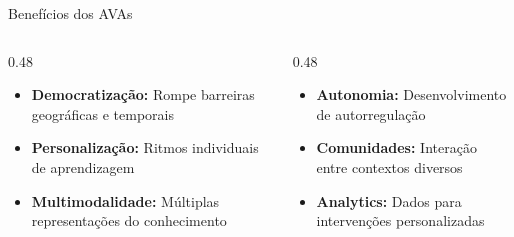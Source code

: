 \documentclass[aspectratio=169,xcolor=table]{beamer}
\begin{document}
\begin{frame}{Benefícios dos AVAs}
    \begin{columns}[T]
        \begin{column}{0.48\textwidth}
            \begin{itemize}
                \item \textbf{Democratização:} Rompe barreiras geográficas e temporais
                \item \textbf{Personalização:} Ritmos individuais de aprendizagem
                \item \textbf{Multimodalidade:} Múltiplas representações do conhecimento
            \end{itemize}
        \end{column}
        \begin{column}{0.48\textwidth}
            \begin{itemize}
                \item \textbf{Autonomia:} Desenvolvimento de autorregulação
                \item \textbf{Comunidades:} Interação entre contextos diversos
                \item \textbf{Analytics:} Dados para intervenções personalizadas
            \end{itemize}
        \end{column}
    \end{columns}
\end{frame}
\end{document}
